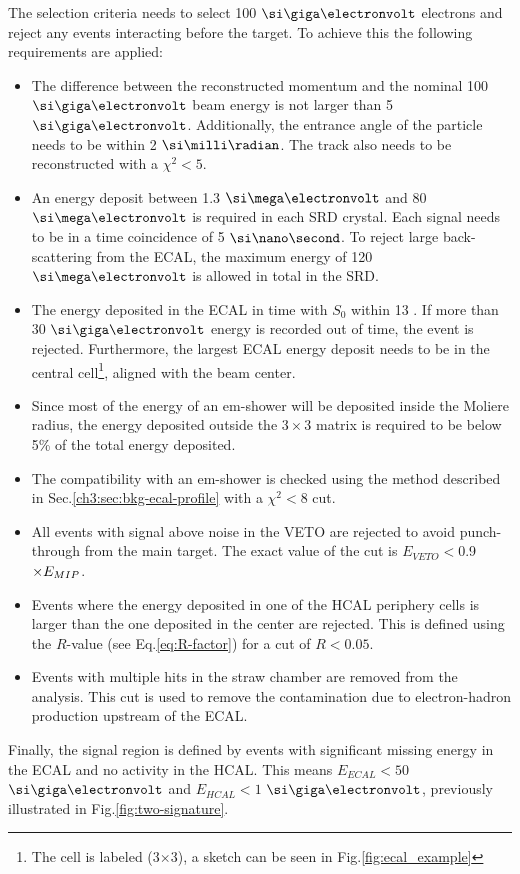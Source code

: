 The selection criteria needs to select 100 $\gev$ electrons and reject any events interacting before the target.
To achieve this the following requirements are applied:

\begin{itemize}
\item The difference between the reconstructed momentum and the nominal 100 $\gev$ beam energy is not larger than 5 $\gev$. Additionally, the entrance angle of the particle needs to be within 2 $\mrad$. The track also needs to be reconstructed with a $\chi^2<5$.
\item An energy deposit between 1.3 $\mev$ and 80 $\mev$ is required in each SRD crystal. Each signal needs to be in a time coincidence of 5 $\nas$. To reject large back-scattering from the ECAL, the maximum energy of 120 $\mev$ is allowed in total in the SRD.
\item The energy deposited in the ECAL in time with $S_0$ within 13 \nas. If more than 30 $\gev$ energy is recorded out of time, the event is rejected. Furthermore, the largest ECAL energy deposit needs to be in the central cell\footnote{The cell is labeled (3$\times$3), a sketch can be seen in Fig.\ref{fig:ecal_example}}, aligned with the beam center. 
\item Since most of the energy of an em-shower will be deposited inside the Moliere radius, the energy deposited outside the $3\times3$ matrix is required to be below 5\% of the total energy deposited. 
\item The compatibility with an em-shower is checked using the method described in Sec.\ref{ch3:sec:bkg-ecal-profile} with a $\chi^2 < 8$ cut.
\item All events with signal above noise in the VETO are rejected to avoid punch-through from the main target. The exact value of the cut is $E_{VETO} <$0.9$\times E_{MIP}$.
\item Events where the energy deposited in one of the HCAL periphery cells is larger than the one deposited in the center are rejected. This is defined using the $R$-value (see Eq.\ref{eq:R-factor}) for a cut of $R < 0.05$.
\item Events with multiple hits in the straw chamber are removed from the analysis. This cut is used to remove the contamination due to electron-hadron production upstream of the ECAL.
\end{itemize}

Finally, the signal region is defined by events with significant missing energy in the ECAL and no activity in the HCAL. This means $E_{ECAL} < 50$ $\gev$ and $E_{HCAL} < 1$ $\gev$, previously illustrated in Fig.\ref{fig:two-signature}.

